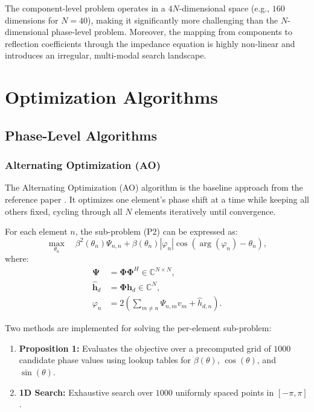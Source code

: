 \documentclass[12pt,a4paper]{article}
\newcommand{\mat}[1]{\mathbf{#1}}
\begin{document}
The component-level problem operates in a $4N$-dimensional space (e.g., $160$ dimensions for $N = 40$), making it significantly more challenging than the $N$-dimensional phase-level problem. Moreover, the mapping from components to reflection coefficients through the impedance equation is highly non-linear and introduces an irregular, multi-modal search landscape.


\section{Optimization Algorithms}
\label{sec:algorithms}

\subsection{Phase-Level Algorithms}

\subsubsection{Alternating Optimization (AO)}
\label{sec:ao}

The Alternating Optimization (AO) algorithm is the baseline approach from the reference paper \cite{abeywickrama2020intelligent}. It optimizes one element's phase shift at a time while keeping all others fixed, cycling through all $N$ elements iteratively until convergence.

For each element $n$, the sub-problem (P2) can be expressed as:
\begin{equation}
    \max_{\theta_n} \quad \beta^2(\theta_n) \Psi_{n,n} + \beta(\theta_n) |\varphi_n| \cos\left(\arg(\varphi_n) - \theta_n\right),
    \label{eq:subproblem}
\end{equation}
where:
\begin{align}
    \mat{\Psi} &= \mat{\Phi} \mat{\Phi}^H \in \mathbb{C}^{N \times N}, \\
    \hat{\mat{h}}_d &= \mat{\Phi} \mat{h}_d \in \mathbb{C}^{N}, \\
    \varphi_n &= 2\left(\sum_{m \neq n} \Psi_{n,m} v_m + \hat{h}_{d,n}\right).
\end{align}

Two methods are implemented for solving the per-element sub-problem:
\begin{enumerate}
    \item \textbf{Proposition 1:} Evaluates the objective over a precomputed grid of $1000$ candidate phase values using lookup tables for $\beta(\theta)$, $\cos(\theta)$, and $\sin(\theta)$.
    \item \textbf{1D Search:} Exhaustive search over $1000$ uniformly spaced points in $[-\pi, \pi]$.
\end{enumerate}
\end{document}
